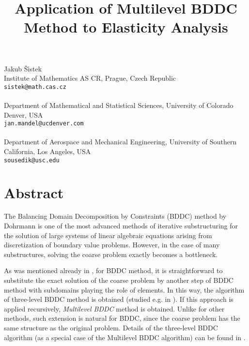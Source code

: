 \title{Application of Multilevel BDDC Method to Elasticity Analysis}
 \author{} \institute{}
\maketitle
\begin{center}
{\large Jakub \v{S}\'{\i}stek}\\
Institute of Mathematics AS CR, Prague, Czech Republic\\
{\tt sistek@math.cas.cz}
\\ \vspace{4mm}{\large Jan Mandel}\\
Department of Mathematical and Statistical Sciences, University of Colorado Denver, USA\\
{\tt jan.mandel@ucdenver.com}
\\ \\
Department of Aerospace and Mechanical Engineering, University of Southern California, Los Angeles, USA\\
{\tt sousedik@usc.edu}

\end{center}

\section*{Abstract}

The Balancing Domain Decomposition by Constraints (BDDC) method by Dohrmann \cite{Dohrmann-2003-PSC} 
is one of the most advanced methods of iterative substructuring for the solution of large systems of linear algebraic
equations arising from discretization of boundary value problems.  
However, in the case of many substructures, solving the coarse problem exactly becomes a bottleneck. 

As was mentioned already in \cite{Dohrmann-2003-PSC}, 
for BDDC method, it is straightforward to substitute the exact solution of the coarse problem by another step of BDDC method
with subdomains playing the role of elements. 
In this way, the algorithm of three-level BDDC method is obtained (studied e.g. in \cite{Tu-2007-TBT3D}).
If this approach is applied recursively, \emph{Multilevel BDDC} \cite{Mandel-2008-MMB} method is obtained.
Unlike for other methods, such extension is natural for BDDC, since the coarse problem has the same structure as the original problem. 
Details of the three-level BDDC algorithm (as a special case of the Multilevel BDDC algorithm) can be found in \cite{Mandel-2008-MMB}.

